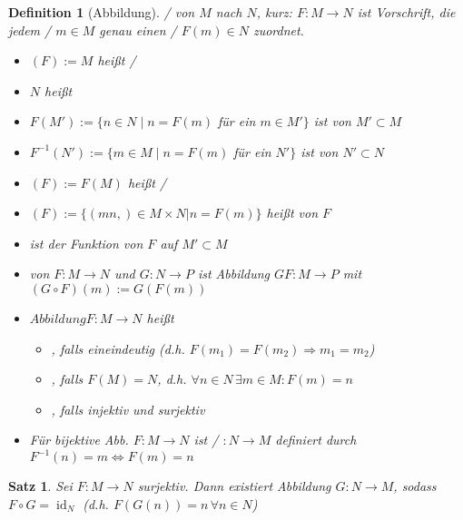 \documentclass[ngerman,a4paper]{report}
\theoremstyle{break}
\newtheorem{satz}[theorem]{Satz}
\newtheorem*{definition}{Definition}
\newcommand{\highlight}[1]{\emph{#1}}
\DeclareMathOperator{\id}{id}
\DeclareMathOperator{\graph}{graph}
\begin{document}
\begin{definition}[Abbildung]
	/ von $M$ nach $N$, kurz: $F:M\rightarrow N$ ist Vorschrift, die jedem  /  $m\in M$ genau einen  /  $F(m)\in N$ zuordnet.
	
	\begin{itemize}
		\item {}$(F):=M$ heißt  / 
		\item $N$ heißt 
		\item $F(M'):=\{n\in N \mid n=F(m)$ für ein $m\in M'\}$ ist \highlight{ von $M'$}$\subset M$
		\item $F^{-1}(N'):=\{ m\in M\mid n=F(m)$ für ein $N' \}$ ist \highlight{ von $N'$}$\subset N$
		\item {}$(F):= F(M)$ heißt  / 
		\item \mathsymbol{graph}{$\graph$}$(F) :=\{ (mn,)\in M\times N | n = F(m)\}$ heißt \highlight{von $F$}
		\item {} ist \highlight{der Funktion} von $F$ auf $M'\subset M$
		\item {} von $F:M\rightarrow N$ und $G:N\rightarrow P$ ist Abbildung $G$$F:M\rightarrow P$ mit $(G\circ F)(m):=G(F(m))$
		\item $Abbildung F:M\rightarrow N$ heißt
		\begin{itemize}
			\item {}, falls eineindeutig (d.h. $F(m_1) = F(m_2) \Rightarrow m_1 = m_2$)
			\item {}, falls $F(M) = N$, d.h. $\forall n\in N\,\exists m\in M: F(m) = n$
			\item {}, falls injektiv und surjektiv
		\end{itemize}
		\item Für bijektive Abb. $F:M\rightarrow N$ ist  /  $:N\rightarrow M$ definiert durch $F^{-1}(n) = m \Leftrightarrow F(m) = n$
	\end{itemize}
\end{definition}

\begin{satz}
	Sei $F:M\rightarrow N$ surjektiv. Dann existiert Abbildung $G:N\rightarrow M$, sodass $F\circ G = \id_N$ (d.h. $F(G(n)) = n\,\forall n\in N$)
\end{satz}
\end{document}

